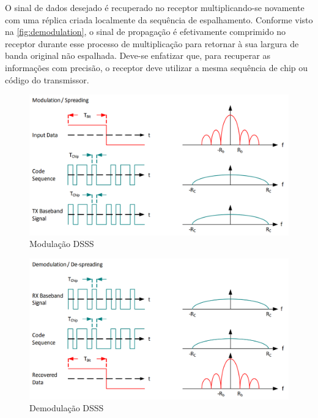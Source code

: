 \documentclass[
	12pt,				%
	openright,			%
	twoside,			%
	a4paper,			%
	english,			%
	french,				%
	spanish,			%
	brazil				%
	]{abntex2}
\begin{document}
O sinal de dados desejado é recuperado no receptor multiplicando-se novamente com uma réplica criada localmente da sequência de espalhamento. Conforme visto na \autoref{fig:demodulation}, o sinal de propagação é efetivamente comprimido no receptor durante esse processo de multiplicação para retornar à sua largura de banda original não espalhada. Deve-se enfatizar que, para recuperar as informações com precisão, o receptor deve utilizar a mesma sequência de chip ou código do transmissor.

\begin{figure}[H]
	\caption{\label{fig:modulation}Modulação DSSS}
	\begin{center}
	    \includegraphics[scale=0.45]{img/Mod.png}
	\end{center}
\end{figure}

\begin{figure}[H]
	\caption{\label{fig:demodulation}Demodulação DSSS}
	\begin{center}
	    \includegraphics[scale=0.45]{img/Demod.png}
	\end{center}
\end{figure}
\end{document}
